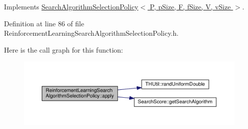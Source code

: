 Implements \hyperlink{classSearchAlgorithmSelectionPolicy_a0f316179ba1d9590efa74cac86eac777}{Search\+Algorithm\+Selection\+Policy$<$ P, p\+Size, F, f\+Size, V, v\+Size $>$}.



Definition at line 86 of file Reinforcement\+Learning\+Search\+Algorithm\+Selection\+Policy.\+h.



Here is the call graph for this function\+:\nopagebreak
\begin{figure}[H]
\begin{center}
\leavevmode
\includegraphics[width=350pt]{classReinforcementLearningSearchAlgorithmSelectionPolicy_a4bd477b9e70030b13bc214cec3fa71d1_cgraph}
\end{center}
\end{figure}


